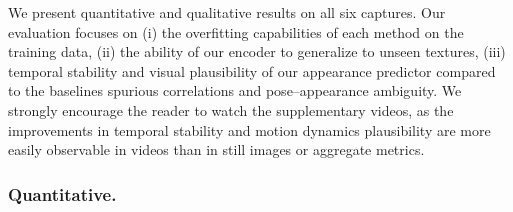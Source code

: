 \documentclass[runningheads]{llncs}
\begin{document}
We present quantitative and qualitative results on all six captures.
Our evaluation focuses on (i) the overfitting capabilities of each method on the training data, (ii) the ability of our encoder to generalize to unseen textures, (iii) temporal stability and visual plausibility of our appearance predictor compared to the baselines \wrt spurious correlations and pose--appearance ambiguity.
We strongly encourage the reader to watch the supplementary videos, as the improvements in temporal stability and motion dynamics plausibility are more easily observable in videos than in still images or aggregate metrics.


\subsubsection{Quantitative.}
\end{document}
